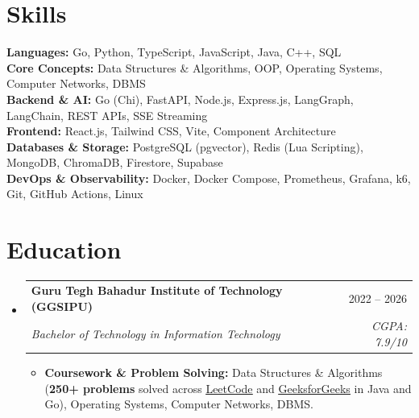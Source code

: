 \documentclass[letterpaper,10pt]{article}
\makeatletter
\newcommand{\ulink}[2]{\href{#1}{\textcolor{linkblue}{\underline{#2}}}}
\newcommand{\resumeItem}[1]{
  \item{
    {#1}
  }
}
\newcommand{\resumeSubheading}[4]{
  \item
    \begin{tabular*}{\linewidth}[t]{l@{\extracolsep{\fill}}r}
      \textbf{#1} & #2 \\
      \textit{\small#3} & \textit{\small #4} \\
    \end{tabular*}\vspace{-2pt}
}
\newcommand{\resumeSubHeadingListStart}{\begin{itemize}[leftmargin=0.15in, label={}, itemsep=5.5pt, topsep=2pt]}
\newcommand{\resumeSubHeadingListEnd}{\end{itemize}}
\newcommand{\resumeItemListStart}{\begin{itemize}[leftmargin=0.18in, label=$\vcenter{\hbox{\tiny$\bullet$}}$, itemsep=2.5pt, topsep=2.5pt]}
\newcommand{\resumeItemListEnd}{\end{itemize}\vspace{-2pt}}
\makeatother
\begin{document}
\section{Skills}
\begin{itemize}[leftmargin=0.15in, label={}]
    \small{\item{
     \textbf{Languages:} Go, Python, TypeScript, JavaScript, Java, C++, SQL \\[2pt]
     \textbf{Core Concepts:} Data Structures \& Algorithms, OOP, Operating Systems, Computer Networks, DBMS \\[2pt]
     \textbf{Backend \& AI:} Go (Chi), FastAPI, Node.js, Express.js, LangGraph, LangChain, REST APIs, SSE Streaming \\[2pt]
     \textbf{Frontend:} React.js, Tailwind CSS, Vite, Component Architecture \\[2pt]
     \textbf{Databases \& Storage:} PostgreSQL (pgvector), Redis (Lua Scripting), MongoDB, ChromaDB, Firestore, Supabase \\[2pt]
     \textbf{DevOps \& Observability:} Docker, Docker Compose, Prometheus, Grafana, k6, Git, GitHub Actions, Linux
    }}
\end{itemize}

\section{Education}
\resumeSubHeadingListStart
  \resumeSubheading
    {Guru Tegh Bahadur Institute of Technology (GGSIPU)}{2022 -- 2026}
    {Bachelor of Technology in Information Technology}{CGPA: 7.9/10}
  \resumeItemListStart
    \resumeItem{\textbf{Coursework \& Problem Solving:} Data Structures \& Algorithms (\textbf{250+ problems} solved across \ulink{https://leetcode.com/u/pssv_aggrsv_coder/}{LeetCode} and \ulink{https://www.geeksforgeeks.org}{GeeksforGeeks} in Java and Go), Operating Systems, Computer Networks, DBMS.}
  \resumeItemListEnd
\resumeSubHeadingListEnd
\end{document}
